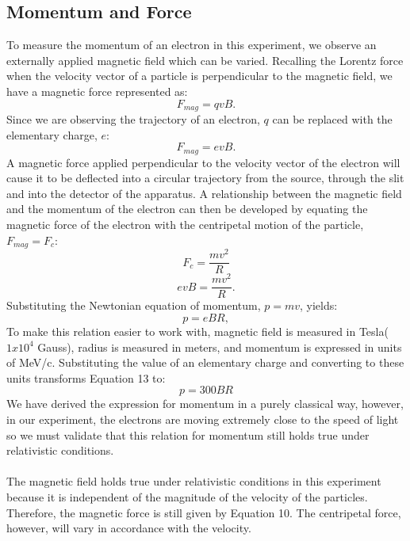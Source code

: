 \subsection{Momentum and Force}
To measure the momentum of an electron in this experiment, we observe an externally applied magnetic field which can be varied. Recalling the Lorentz force when the velocity vector of a particle is perpendicular to the magnetic field, we have a magnetic force represented as:
\begin{equation} F_{mag}=qvB. \end {equation}
Since we are observing the trajectory of an electron, $q$ can be replaced with the elementary charge, $e$: 
\begin{equation} F_{mag}=evB.\end{equation}
A magnetic force applied perpendicular to the velocity vector of the electron will cause it to be deflected into a circular trajectory from the source, through the slit and into the detector of the apparatus. A relationship between the magnetic field and the momentum of the electron can then be developed by equating the magnetic force of the electron with the centripetal motion of the particle,$F_{mag}=F_c$:
\begin{equation} F_c=\frac{mv^2}{R}\end{equation}
\begin{equation} evB=\frac{mv^2}{R}.\end {equation}
Substituting the Newtonian equation of momentum, $p=mv$, yields:
\begin{equation}p=eBR,\end{equation}
To make this relation easier to work with, magnetic field is measured in Tesla($1x10^4$ Gauss), radius is measured in meters, and momentum is expressed in units of MeV/c. Substituting the value of an elementary charge and converting to these units transforms Equation 13 to:
\begin{equation} p=300BR\end{equation}
We have derived the expression for momentum in a purely classical way, however, in our experiment, the electrons are moving extremely close to the speed of light so we must validate that this relation for momentum still holds true under relativistic conditions.
\\
\\
The magnetic field holds true under relativistic conditions in this experiment because it is independent of the magnitude of the velocity of the particles. Therefore, the magnetic force is still given by Equation 10. The centripetal force, however, will vary in accordance with the velocity. 
